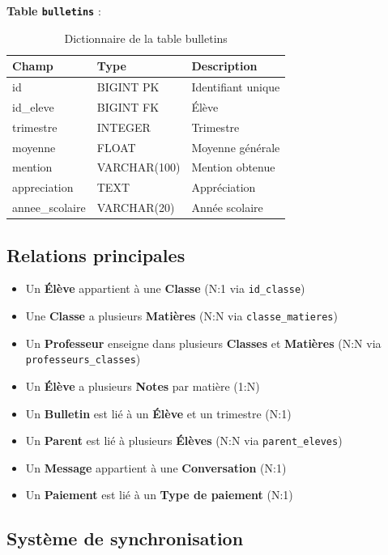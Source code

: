 \documentclass[12pt,a4paper,twoside]{report}
\begin{document}
\textbf{Table \texttt{bulletins}} :
\begin{table}[h]
\centering
\caption{Dictionnaire de la table bulletins}
\begin{tabular}{lll}
\toprule
Champ & Type & Description \\
\midrule
id & BIGINT PK & Identifiant unique \\
id\_eleve & BIGINT FK & Élève \\
trimestre & INTEGER & Trimestre \\
moyenne & FLOAT & Moyenne générale \\
mention & VARCHAR(100) & Mention obtenue \\
appreciation & TEXT & Appréciation \\
annee\_scolaire & VARCHAR(20) & Année scolaire \\
\bottomrule
\end{tabular}
\end{table}

\subsection{Relations principales}

\begin{itemize}
    \item Un \textbf{Élève} appartient à une \textbf{Classe} (N:1 via \texttt{id\_classe})
    \item Une \textbf{Classe} a plusieurs \textbf{Matières} (N:N via \texttt{classe\_matieres})
    \item Un \textbf{Professeur} enseigne dans plusieurs \textbf{Classes} et \textbf{Matières} (N:N via \texttt{professeurs\_classes})
    \item Un \textbf{Élève} a plusieurs \textbf{Notes} par matière (1:N)
    \item Un \textbf{Bulletin} est lié à un \textbf{Élève} et un trimestre (N:1)
    \item Un \textbf{Parent} est lié à plusieurs \textbf{Élèves} (N:N via \texttt{parent\_eleves})
    \item Un \textbf{Message} appartient à une \textbf{Conversation} (N:1)
    \item Un \textbf{Paiement} est lié à un \textbf{Type de paiement} (N:1)
\end{itemize}

\subsection{Système de synchronisation}
\end{document}
